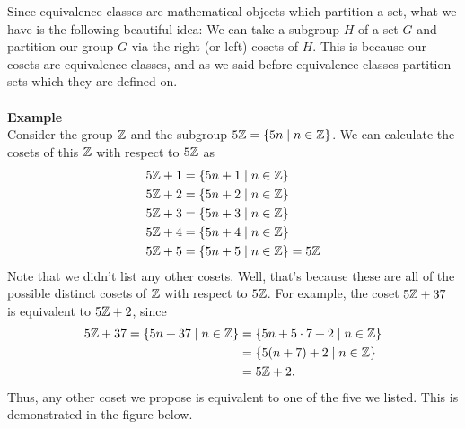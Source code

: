     \textcolor{NavyBlue!100!black!100}{Since equivalence classes are mathematical objects which partition
    a set, what we have is the following beautiful idea: We can take a
    subgroup $H$ of a set $G$ and partition our group $G$ via the
    right (or left) cosets of $H$. This is because our cosets are
    equivalence classes, and as we said before equivalence classes
    partition sets which they are defined on.}
    \\
    \\
    \textbf{Example}\\
    Consider the group $\mathbb{Z}$ and the subgroup $5\mathbb{Z} = \{5n \mid n \in \mathbb{Z}\}$. 
    We can calculate the cosets of this $\mathbb{Z}$ with respect to $5\mathbb{Z}$ as 
    \begin{align*}
        5\mathbb{Z} + 1 &= \{5n + 1 \mid n \in \mathbb{Z}\}\\
        5\mathbb{Z} + 2 &= \{5n + 2 \mid n \in \mathbb{Z}\}\\
        5\mathbb{Z} + 3 &= \{5n + 3 \mid n \in \mathbb{Z}\}\\
        5\mathbb{Z} + 4 &= \{5n + 4 \mid n \in \mathbb{Z}\}\\
        5\mathbb{Z} + 5 &= \{5n + 5 \mid n \in \mathbb{Z} \} = 5\mathbb{Z}
    \end{align*}
    Note that we didn't list any other
    cosets. Well, that's because these are all of the possible
    distinct cosets of $\mathbb{Z}$ with respect to $5\mathbb{Z}$. For example, the coset $5\mathbb{Z} + 37$ is
    equivalent to $5\mathbb{Z} + 2$, since 
    \begin{align*}
        5\mathbb{Z} + 37 = \{5n + 37 \mid n \in \mathbb{Z}\}
        &= \{5n + 5\cdot 7 + 2 \mid n \in \mathbb{Z}\}\\
        &=\{5(n+7) + 2 \mid n \in \mathbb{Z}\}\\
        &= 5\mathbb{Z} + 2.
    \end{align*}
    Thus, any other coset we propose is equivalent to one of the five
    we listed. This is demonstrated in the figure below.

